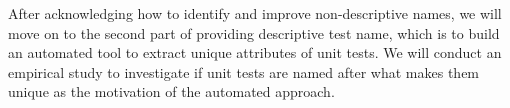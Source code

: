



After acknowledging how to identify and improve non-descriptive names, we will move on to the second part of providing descriptive test name, which is to build an automated tool to extract unique attributes of unit tests.
%
We will conduct an empirical study to investigate if unit tests are named after what makes them unique as the motivation of the automated approach.
